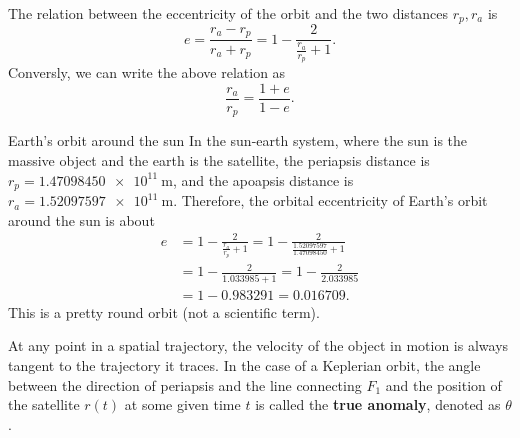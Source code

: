 The relation between the eccentricity of the orbit and the two distances $r_{p},r_{a}$ is
\begin{equation}
  e = \frac{r_{a}-r_{p}}{r_{a}+r_{p}} = 1-\frac{2}{\frac{r_{a}}{r_{p}}+1}.
  \label{eq:eccentricity_relation_to_apsis_1}
\end{equation}
Conversly, we can write the above relation as
\begin{equation}
  \frac{r_{a}}{r_{p}} = \frac{1+e}{1-e}.
  \label{eq:eccentricity_relation_to_apsis_2}
\end{equation}

\begin{example}{Earth's orbit around the sun}{}
  In the sun-earth system, where the sun is the massive object and the earth is the satellite, the periapsis distance is $r_{p}=\SI{1.47098450e+11}{\meter}$, and the apoapsis distance is $r_{a}=\SI{1.52097597e+11}{\meter}$. Therefore, the orbital eccentricity of Earth's orbit around the sun is about
  \begin{align*}
    e &= 1-\frac{2}{\frac{r_{a}}{r_{p}}+1} = 1-\frac{2}{\frac{1.52097597}{1.47098450}+1}\\
      &= 1-\frac{2}{1.033985+1} = 1-\frac{2}{2.033985}\\
      &= 1-0.983291 = 0.016709.
  \end{align*}
  This is a pretty round orbit (not a scientific term). 
\end{example}

At any point in a spatial trajectory, the velocity of the object in motion is always tangent to the trajectory it traces.  In the case of a Keplerian orbit, the angle between the direction of periapsis and the line connecting $F_{1}$ and the position of the satellite $r(t)$ at some given time $t$ is called the \textbf{true anomaly}, denoted as $\theta$.

